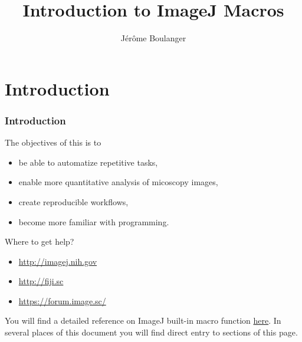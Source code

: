 \newcommand{\kw}[1]{\textcolor{orange}{\textbf{#1}}}
\newcommand{\code}[1] {\textcolor{gray}{\texttt{#1}}}
\setcounter{tocdepth}{1}
\title{Introduction to ImageJ Macros}
\author{J\'er\^ome Boulanger}
\date{}

\begin{frame}
  \maketitle
\end{frame}


\section{Introduction}
\begin{frame}
  \frametitle<presentation>{Introduction}
  The objectives of this  is to
  \begin{itemize}
    \item be able to automatize repetitive tasks,
    \item enable more quantitative analysis of micoscopy images,
    \item create reproducible workflows,
    \item become more familiar with programming.
  \end{itemize}
  Where to get help?
  \begin{itemize}
    \item \url{http://imagej.nih.gov}
    \item \url{http://fiji.sc}
    \item \url{https://forum.image.sc/}
  \end{itemize}
\end{frame}

You will find a detailed reference on ImageJ built-in macro function
\href{http://rsb.info.nih.gov/ij/developer/macro/functions.html}{here}. In
several places of this document you will find direct entry to sections
of this page.

